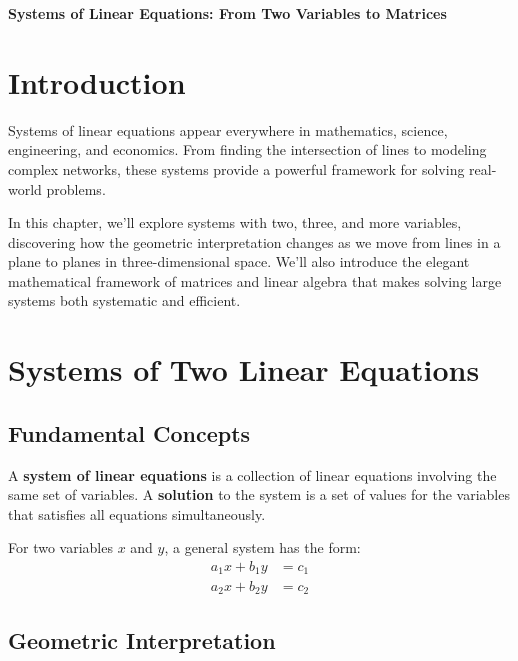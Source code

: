 \documentclass[12pt]{article}
\begin{document}
\begin{center}
\textbf{\Large Systems of Linear Equations: From Two Variables to Matrices} \\
\vspace{0.5cm}
\hspace{0.1\textwidth}
\end{center}

\vspace{0.5cm}

\section{Introduction}

Systems of linear equations appear everywhere in mathematics, science, engineering, and economics. From finding the intersection of lines to modeling complex networks, these systems provide a powerful framework for solving real-world problems.

In this chapter, we'll explore systems with two, three, and more variables, discovering how the geometric interpretation changes as we move from lines in a plane to planes in three-dimensional space. We'll also introduce the elegant mathematical framework of matrices and linear algebra that makes solving large systems both systematic and efficient.

\section{Systems of Two Linear Equations}

\subsection{Fundamental Concepts}

A \textbf{system of linear equations} is a collection of linear equations involving the same set of variables. A \textbf{solution} to the system is a set of values for the variables that satisfies all equations simultaneously.

For two variables $x$ and $y$, a general system has the form:
\begin{align}
a_1x + b_1y &= c_1 \\
a_2x + b_2y &= c_2
\end{align}

\subsection{Geometric Interpretation}
\end{document}
